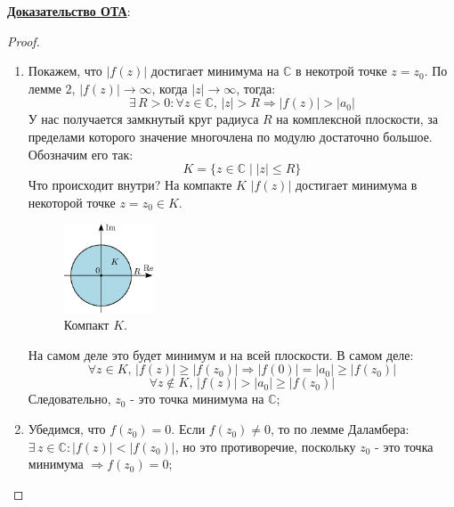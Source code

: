 \documentclass[12pt]{article}
\newcommand{\MC}{\mathbb{C}}
\theoremstyle{definition}
\begin{document}
\textbf{\uline{Доказательство ОТА}}:
\begin{proof}\hfill
	\begin{enumerate}[label=\arabic*)]
		\item Покажем, что $|f(z)|$ достигает минимума на $\MC$ в некотрой точке $z = z_0$. По лемме $2$, $|f(z)| \to \infty$, когда $|z| \to \infty$, тогда:
		$$
			\exists \, R > 0 \colon \forall z \in \MC, \, |z| > R \Rightarrow |f(z)|  > |a_0|
		$$
		У нас получается замкнутый круг радиуса $R$ на комплексной плоскости, за пределами которого значение многочлена по модулю достаточно большое. Обозначим его так: 
		$$
			K = \{z \in \MC \mid |z| \leq R\}
		$$
		Что происходит внутри? На компакте $K$ $|f(z)|$ достигает минимума в некоторой точке $z = z_0 \in K$.
		\begin{figure}[H]
			\centering
			\includegraphics[width=0.25\textwidth]{AL1L18_5.eps}
			\caption{Компакт $K$.}
			\label{18_5}
		\end{figure}
		На самом деле это будет минимум и на всей плоскости. В самом деле:
		$$
			\forall z \in K, \, |f(z)| \geq |f(z_0)| \Rightarrow |f(0)| = |a_0| \geq |f(z_0)|
		$$
		$$
			\forall z \not\in K,\, |f(z)| > |a_0| \geq |f(z_0)|
		$$
		Следовательно, $z_0$ - это точка минимума на $\MC$;
		\item Убедимся, что $f(z_0) = 0$. Если $f(z_0) \neq 0$, то по лемме Даламбера: $\exists \, z \in \MC \colon |f(z)| < |f(z_0)|$, но это противоречие, поскольку $z_0$ - это точка минимума $\Rightarrow f(z_0) = 0$;
	\end{enumerate}
\end{proof}
\newpage
\end{document}

